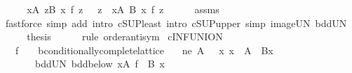 \begin{isabellebody}
\ \ \isamarkupfalse%
\ \isamarkupfalse%
\ {\isachardoublequoteopen}{\isacharparenleft}{\kern0pt}{\isasymSqunion}x{\isasymin}A{\isachardot}{\kern0pt}\ {\isasymSqunion}z{\isasymin}B\ x{\isachardot}{\kern0pt}\ f\ z{\isacharparenright}{\kern0pt}\ {\isasymle}\ {\isacharparenleft}{\kern0pt}{\isasymSqunion}\ z\ {\isasymin}\ {\isasymUnion}x{\isasymin}A{\isachardot}{\kern0pt}\ B\ x{\isachardot}{\kern0pt}\ f\ z{\isacharparenright}{\kern0pt}{\isachardoublequoteclose}\isanewline
\ \ \ \ \isamarkupfalse%
\ assms\ \isamarkupfalse%
\ {\isacharparenleft}{\kern0pt}fastforce\ simp\ add{\isacharcolon}{\kern0pt}\ intro{\isacharbang}{\kern0pt}{\isacharcolon}{\kern0pt}\ cSUP{\isacharunderscore}{\kern0pt}least\ intro{\isacharcolon}{\kern0pt}\ cSUP{\isacharunderscore}{\kern0pt}upper\ simp{\isacharcolon}{\kern0pt}\ image{\isacharunderscore}{\kern0pt}UN\ bdd{\isacharunderscore}{\kern0pt}UN{\isacharparenright}{\kern0pt}\isanewline
\ \ \isamarkupfalse%
\ \isamarkupfalse%
\ {\isacharquery}{\kern0pt}thesis\isanewline
\ \ \ \ \isamarkupfalse%
\ {\isacharparenleft}{\kern0pt}rule\ order{\isacharunderscore}{\kern0pt}antisym{\isacharparenright}{\kern0pt}\isanewline
{}\isamarkupfalse%
%
\endisatagproof
{\isafoldproof}%
%
\isadelimproof
\isanewline
%
\endisadelimproof
\isanewline
{}\isamarkupfalse%
\ cINF{\isacharunderscore}{\kern0pt}UNION{\isacharcolon}{\kern0pt}\isanewline
\ \ \ f\ {\isacharcolon}{\kern0pt}{\isacharcolon}{\kern0pt}\ {\isachardoublequoteopen}{\isacharunderscore}{\kern0pt}\ {\isasymRightarrow}\ {\isacharprime}{\kern0pt}b{\isacharcolon}{\kern0pt}{\isacharcolon}{\kern0pt}conditionally{\isacharunderscore}{\kern0pt}complete{\isacharunderscore}{\kern0pt}lattice{\isachardoublequoteclose}\isanewline
\ \ \ ne{\isacharcolon}{\kern0pt}\ {\isachardoublequoteopen}A\ {\isasymnoteq}\ {\isacharbraceleft}{\kern0pt}{\isacharbraceright}{\kern0pt}{\isachardoublequoteclose}\ {\isachardoublequoteopen}{\isasymAnd}x{\isachardot}{\kern0pt}\ x\ {\isasymin}\ A\ {\isasymLongrightarrow}\ B{\isacharparenleft}{\kern0pt}x{\isacharparenright}{\kern0pt}\ {\isasymnoteq}\ {\isacharbraceleft}{\kern0pt}{\isacharbraceright}{\kern0pt}{\isachardoublequoteclose}\isanewline
\ \ \ \ \ \ \ bdd{\isacharunderscore}{\kern0pt}UN{\isacharcolon}{\kern0pt}\ {\isachardoublequoteopen}bdd{\isacharunderscore}{\kern0pt}below\ {\isacharparenleft}{\kern0pt}{\isasymUnion}x{\isasymin}A{\isachardot}{\kern0pt}\ f\ {\isacharbackquote}{\kern0pt}\ B\ x{\isacharparenright}{\kern0pt}{\isachardoublequoteclose}\isanewline

\end{isabellebody}
